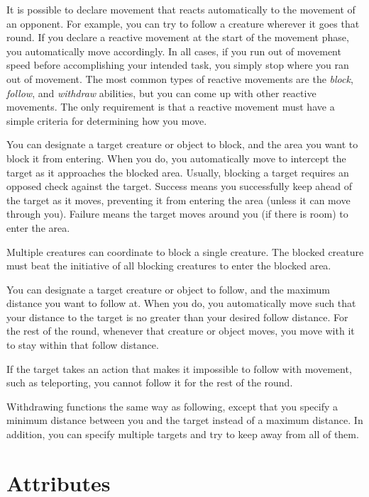         It is possible to declare movement that reacts automatically to the movement of an opponent.
        For example, you can try to follow a creature wherever it goes that round.
        If you declare a reactive movement at the start of the movement phase, you automatically move accordingly.
        In all cases, if you run out of movement speed before accomplishing your intended task, you simply stop where you ran out of movement.
        The most common types of reactive movements are the \textit{block}, \textit{follow}, and \textit{withdraw} abilities, but you can come up with other reactive movements.
        The only requirement is that a reactive movement must have a simple criteria for determining how you move.

        \label{Block} You can designate a target creature or object to block, and the area you want to block it from entering.
        When you do, you automatically move to intercept the target as it approaches the blocked area.
        Usually, blocking a target requires an opposed  check against the target.
        Success means you successfully keep ahead of the target as it moves, preventing it from entering the area (unless it can move through you).
        Failure means the target moves around you (if there is room) to enter the area.

        Multiple creatures can coordinate to block a single creature.
        The blocked creature must beat the initiative of all blocking creatures to enter the blocked area.

        \label{Follow} You can designate a target creature or object to follow, and the maximum distance you want to follow at. When you do, you automatically move such that your distance to the target is no greater than your desired follow distance. For the rest of the round, whenever that creature or object moves, you move with it to stay within that follow distance.

        If the target takes an action that makes it impossible to follow with movement, such as teleporting, you cannot follow it for the rest of the round.

        \label{Withdraw} Withdrawing functions the same way as following, except that you specify a minimum distance between you and the target instead of a maximum distance.
        In addition, you can specify multiple targets and try to keep away from all of them.

    \section{Attributes}\label{Attributes}

